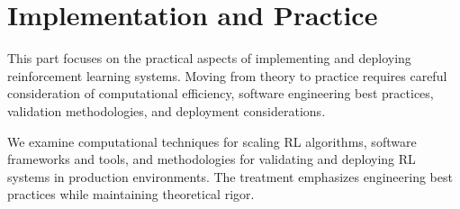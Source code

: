 \part{Implementation and Practice}

This part focuses on the practical aspects of implementing and deploying reinforcement learning systems. Moving from theory to practice requires careful consideration of computational efficiency, software engineering best practices, validation methodologies, and deployment considerations.

We examine computational techniques for scaling RL algorithms, software frameworks and tools, and methodologies for validating and deploying RL systems in production environments. The treatment emphasizes engineering best practices while maintaining theoretical rigor.



